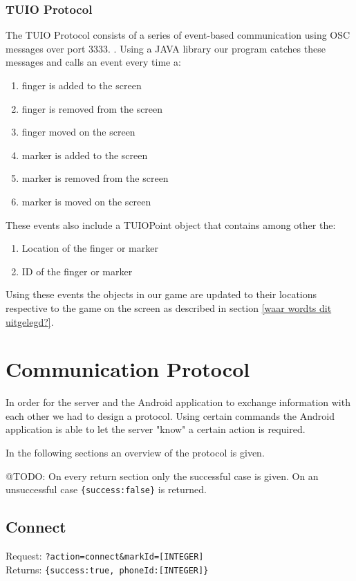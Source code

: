 \documentclass[a4paper,10pt]{article}
\begin{document}
		\subsubsection{TUIO Protocol}
		\label{sec:tuioprotocol}
		The TUIO Protocol consists of a series of event-based communication using OSC messages over port 3333. \cite{tuioProtocol}. 
		Using a JAVA library our program catches these messages and calls an event every time a:
		\begin{enumerate}
			\item finger is added to the screen
			\item finger is removed from the screen
			\item finger moved on the screen
			\item marker is added to the screen
			\item marker is removed from the screen
			\item marker is moved on the screen
		\end{enumerate}
		These events also include a TUIOPoint object that contains among other the:
		\begin{enumerate}
			\item Location of the finger or marker
			\item ID of the finger or marker
		\end{enumerate}
		Using these events the objects in our game are updated to their locations respective to the game on the screen as described in section \ref{waar wordts dit uitgelegd?}.
		
\section{Communication Protocol}
\label{sec:communication-protocol}
In order for the server and the Android application to exchange information with each other we had to design a protocol.
Using certain commands the Android application is able to let the server "know" a certain action is required.

In the following sections an overview of the protocol is given.

@TODO: On every return section only the successful case is given. On an unsuccessful case \texttt{\{success:false\}} is returned.

\subsection{Connect}
Request: \texttt{?action=connect\&markId=[INTEGER]} \\
Returns: \texttt{\{success:true, phoneId:[INTEGER]\}} \\
\end{document}
